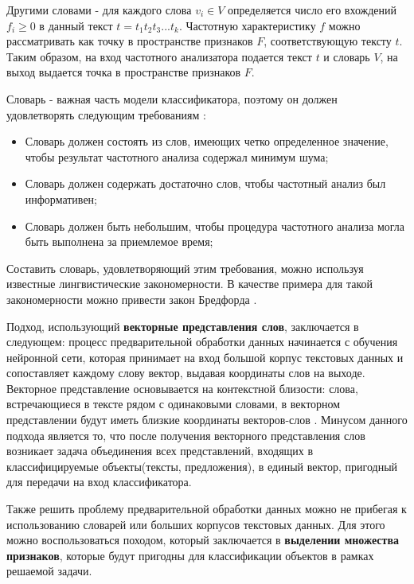 Другими словами - для каждого слова $v_i \in V$	определяется число его вхождений $f_i \geq 0$ в данный текст $t=t_1t_2t_3...t_k$. Частотную характеристику $f$ можно рассматривать как точку в пространстве признаков  $F$, соответствующую тексту  $t$. Таким образом, на вход частотного анализатора подается текст $t$ и словарь $V$, на выход выдается точка в пространстве признаков $F$.

Словарь - важная часть модели классификатора, поэтому он должен удовлетворять следующим требованиям \cite{borisov}:
 \begin{itemize}
	\item Словарь должен состоять из слов, имеющих четко определенное значение, чтобы результат частотного анализа содержал минимум шума;
	\item Словарь должен содержать достаточно слов, чтобы частотный анализ был информативен;
	\item Словарь должен быть небольшим, чтобы процедура частотного анализа могла быть выполнена за приемлемое время;
\end{itemize}

Составить словарь, удовлетворяющий этим требования, можно используя известные лингвистические закономерности. В качестве примера для такой закономерности можно привести закон Бредфорда \cite{lande}.


\vspace{\baselineskip}
Подход, использующий \textbf{векторные представления слов}, заключается в следующем: процесс предварительной обработки данных начинается с обучения нейронной сети, которая принимает на вход большой корпус текстовых данных и сопоставляет каждому слову вектор, выдавая координаты слов на выходе. Векторное представление основывается на контекстной близости: слова, встречающиеся в тексте рядом с одинаковыми словами, в векторном представлении будут иметь близкие координаты векторов-слов \cite{word2vec}. Минусом данного подхода является то, что после получения векторного представления слов возникает задача объединения всех представлений, входящих в классифицируемые объекты(тексты, предложения), в единый вектор, пригодный для передачи на вход классификатора.
\vspace{\baselineskip}

Также решить проблему предварительной обработки данных можно не прибегая к использованию словарей или больших корпусов текстовых данных. Для этого можно воспользоваться походом, который заключается в \textbf{выделении множества признаков}, которые будут пригодны для классификации объектов в рамках решаемой задачи.

